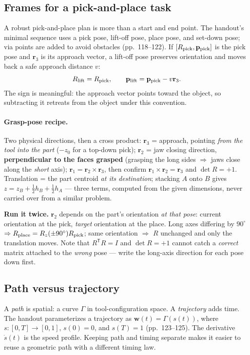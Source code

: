 \documentclass[11pt,a4paper]{article}
\begin{document}
\subsection{Frames for a pick-and-place task}

A robust pick-and-place plan is more than a start and end point. The handout's minimal sequence uses a pick pose, lift-off pose, place pose, and set-down pose; via points are added to avoid obstacles (pp.~118--122). If $[R_{\rm pick},\mathbf p_{\rm pick}]$ is the pick pose and $\mathbf r_3$ is its approach vector, a lift-off pose preserves orientation and moves back a safe approach distance $v$:
\[
  R_{\rm lift}=R_{\rm pick},\qquad
  \mathbf p_{\rm lift}=\mathbf p_{\rm pick}-v\mathbf r_3.
\]
The sign is meaningful: the approach vector points toward the object, so subtracting it retreats from the object under this convention.

\paragraph{Grasp-pose recipe.} Two physical directions, then a cross product:
$\mathbf r_3$ = approach, pointing \emph{from the tool into the part} ($-z_0$ for a top-down pick);
$\mathbf r_2$ = jaw closing direction, \textbf{perpendicular to the faces grasped} (grasping the
long sides $\Rightarrow$ jaws close along the \emph{short} axis); $\mathbf r_1=\mathbf r_2\times\mathbf r_3$,
then confirm $\mathbf r_1\times\mathbf r_2=\mathbf r_3$ and $\det R=+1$. Translation = the part
centroid \emph{at its destination}; stacking $A$ onto $B$ gives
$z=z_B+\tfrac12 h_B+\tfrac12 h_A$ --- three terms, computed from the given dimensions, never carried
over from a similar problem.

\textbf{Run it twice.} $\mathbf r_2$ depends on the part's orientation \emph{at that pose}: current
orientation at the pick, \emph{target} orientation at the place. Long axes differing by $90^\circ$
$\Rightarrow R_{\rm place}=R_z(\pm90^\circ)R_{\rm pick}$; same orientation $\Rightarrow$ $R$
unchanged and only the translation moves. Note that $R^{\mathsf T}R=I$ and $\det R=+1$ cannot catch
a \emph{correct} matrix attached to the \emph{wrong} pose --- write the long-axis direction for each
pose down first.

\subsection{Path versus trajectory}

A \emph{path} is spatial: a curve $\Gamma$ in tool-configuration space. A \emph{trajectory} adds time. The handout parameterizes a trajectory as $\mathbf w(t)=\Gamma(s(t))$, where $s:[0,T]\to[0,1]$, $s(0)=0$, and $s(T)=1$ (pp.~123--125). The derivative $\dot{s}(t)$ is the speed profile. Keeping path and timing separate makes it easier to reuse a geometric path with a different timing law.
\end{document}
